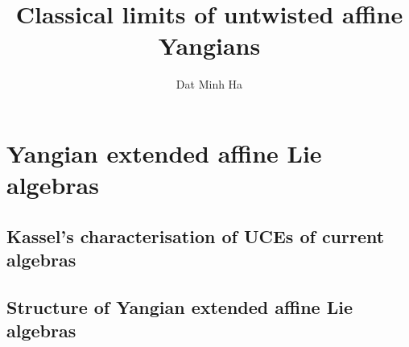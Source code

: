 

\setcounter{chapter}{-1}
\setcounter{section}{-1}


\newcommand{\toroidal}{\t}
\newcommand{\extendedtoroidal}{\hat{\t}}
\newcommand{\simpleroots}{\mathbb{I}}
\renewcommand{\positive}{+} 
\renewcommand{\negative}{-}



    \title{Classical limits of untwisted affine Yangians}
    
    \author{Dat Minh Ha}
    \maketitle
    
    {
      \hypersetup{} 
      \dominitoc
      \tableofcontents %
    }

    \newpage

    \listoftodos

    \newpage

    

    \newpage

    \part{Yangian extended affine Lie algebras}
        \chapter{Kassel's characterisation of UCEs of current algebras}
            \begin{abstract}
                
            \end{abstract}
    
            \minitoc
        
           
    
           

           
    
        \newpage
    
        \chapter{Structure of Yangian extended affine Lie algebras}
            \begin{abstract}
                
            \end{abstract}
    
